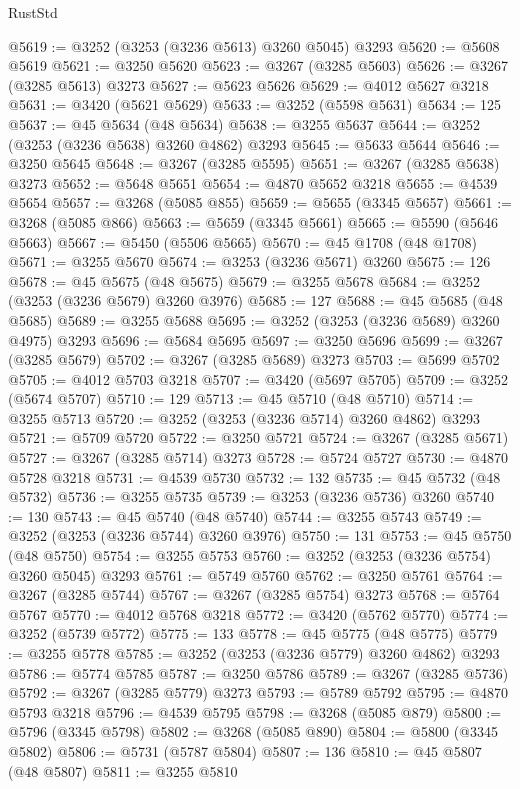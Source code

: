 \begin{lexlean}{RustStd}
\begin{coremodule}
{\begin{coremodule}
{{{{{{{{{{{{{{{{{{{{{{{{{{{{{{{{{{{{{{{@5619 := @3252 (@3253 (@3236 @5613) @3260 @5045) @3293
@5620 := @5608 @5619
@5621 := @3250 @5620
@5623 := @3267 (@3285 @5603)
@5626 := @3267 (@3285 @5613) @3273
@5627 := @5623 @5626
@5629 := @4012 @5627 @3218
@5631 := @3420 (@5621 @5629)
@5633 := @3252 (@5598 @5631)
@5634 := 125
@5637 := @45 @5634 (@48 @5634)
@5638 := @3255 @5637
@5644 := @3252 (@3253 (@3236 @5638) @3260 @4862) @3293
@5645 := @5633 @5644
@5646 := @3250 @5645
@5648 := @3267 (@3285 @5595)
@5651 := @3267 (@3285 @5638) @3273
@5652 := @5648 @5651
@5654 := @4870 @5652 @3218
@5655 := @4539 @5654
@5657 := @3268 (@5085 @855)
@5659 := @5655 (@3345 @5657)
@5661 := @3268 (@5085 @866)
@5663 := @5659 (@3345 @5661)
@5665 := @5590 (@5646 @5663)
@5667 := @5450 (@5506 @5665)
@5670 := @45 @1708 (@48 @1708)
@5671 := @3255 @5670
@5674 := @3253 (@3236 @5671) @3260
@5675 := 126
@5678 := @45 @5675 (@48 @5675)
@5679 := @3255 @5678
@5684 := @3252 (@3253 (@3236 @5679) @3260 @3976)
@5685 := 127
@5688 := @45 @5685 (@48 @5685)
@5689 := @3255 @5688
@5695 := @3252 (@3253 (@3236 @5689) @3260 @4975) @3293
@5696 := @5684 @5695
@5697 := @3250 @5696
@5699 := @3267 (@3285 @5679)
@5702 := @3267 (@3285 @5689) @3273
@5703 := @5699 @5702
@5705 := @4012 @5703 @3218
@5707 := @3420 (@5697 @5705)
@5709 := @3252 (@5674 @5707)
@5710 := 129
@5713 := @45 @5710 (@48 @5710)
@5714 := @3255 @5713
@5720 := @3252 (@3253 (@3236 @5714) @3260 @4862) @3293
@5721 := @5709 @5720
@5722 := @3250 @5721
@5724 := @3267 (@3285 @5671)
@5727 := @3267 (@3285 @5714) @3273
@5728 := @5724 @5727
@5730 := @4870 @5728 @3218
@5731 := @4539 @5730
@5732 := 132
@5735 := @45 @5732 (@48 @5732)
@5736 := @3255 @5735
@5739 := @3253 (@3236 @5736) @3260
@5740 := 130
@5743 := @45 @5740 (@48 @5740)
@5744 := @3255 @5743
@5749 := @3252 (@3253 (@3236 @5744) @3260 @3976)
@5750 := 131
@5753 := @45 @5750 (@48 @5750)
@5754 := @3255 @5753
@5760 := @3252 (@3253 (@3236 @5754) @3260 @5045) @3293
@5761 := @5749 @5760
@5762 := @3250 @5761
@5764 := @3267 (@3285 @5744)
@5767 := @3267 (@3285 @5754) @3273
@5768 := @5764 @5767
@5770 := @4012 @5768 @3218
@5772 := @3420 (@5762 @5770)
@5774 := @3252 (@5739 @5772)
@5775 := 133
@5778 := @45 @5775 (@48 @5775)
@5779 := @3255 @5778
@5785 := @3252 (@3253 (@3236 @5779) @3260 @4862) @3293
@5786 := @5774 @5785
@5787 := @3250 @5786
@5789 := @3267 (@3285 @5736)
@5792 := @3267 (@3285 @5779) @3273
@5793 := @5789 @5792
@5795 := @4870 @5793 @3218
@5796 := @4539 @5795
@5798 := @3268 (@5085 @879)
@5800 := @5796 (@3345 @5798)
@5802 := @3268 (@5085 @890)
@5804 := @5800 (@3345 @5802)
@5806 := @5731 (@5787 @5804)
@5807 := 136
@5810 := @45 @5807 (@48 @5807)
@5811 := @3255 @5810
}}}}}}}}}}}}}}}}}}}}}}}}}}}}}}}}}}}}}}}
\end{coremodule}}
\end{coremodule}
\end{lexlean}

